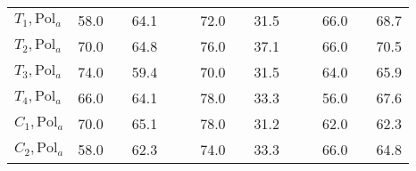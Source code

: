 \begin{table}
\begin{center}
{{\begin{tabular}{l lcr cc lcr cc lcr }
$T_{1}, \text{Pol}_{a}$ & 58.0 & & 64.1 & & & 72.0 & & 31.5 & & & 66.0 & & 68.7 \\
$T_{2}, \text{Pol}_{a}$ & \cellcolor[gray]{0.8}70.0 &\cellcolor[gray]{0.8} & \cellcolor[gray]{0.8}64.8 & & & 76.0 & & 37.1 & & & 66.0 & & 70.5\\
$T_{3}, \text{Pol}_{a}$ & 74.0 & & 59.4 & & & 70.0 & & 31.5 & & & 64.0 & & 65.9\\
$T_{4}, \text{Pol}_{a}$ & 66.0 & & 64.1 & & & 78.0 & & 33.3 & & & 56.0 & & 67.6 \\
$C_{1}, \text{Pol}_{a}$ & \cellcolor[gray]{0.8}70.0 &\cellcolor[gray]{0.8} &\cellcolor[gray]{0.8}65.1 & & & 78.0 & & 31.2 & & & 62.0 & & 62.3\\
$C_{2}, \text{Pol}_{a}$ & 58.0 & & 62.3 & & & 74.0 & & 33.3 & & & 66.0 & & 64.8\\
\bottomrule

\end{tabular}}}
\end{center}
\label{tab:table9}
\end{table}







